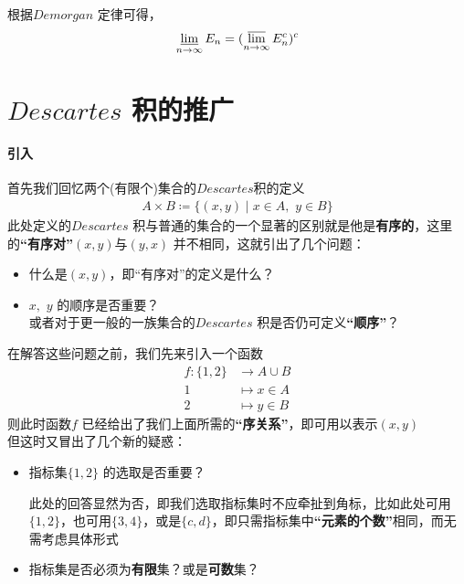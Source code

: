 	根据$Demorgan$ 定律可得，
		\[\varliminf_{n \to \infty}{E_n} = (\varlimsup_{n \to \infty}{E_{n}^{c}})^c\]
		
\section{$Descartes$ 积的推广}
\paragraph{引入}
	首先我们回忆两个(有限个)集合的$Descartes$积的定义
	\begin{align}
		A \times B \coloneqq \{ (x , y) \mid x \in A , \,\, y \in B \}
	\end{align}
	此处定义的$Descartes$ 积与普通的集合的一个显著的区别就是他是\textbf{有序的}，这里的\textbf{“有序对”}$(x , y)$与$(y , x)$ 并不相同，这就引出了几个问题：
	\begin{itemize}
		\item 什么是$(x , y)$，即“有序对”的定义是什么？
		
		\item $x , \,\, y$ 的顺序是否重要？\\
		或者对于更一般的一族集合的$Descartes$ 积是否仍可定义\textbf{“顺序”}？
	\end{itemize}
	在解答这些问题之前，我们先来引入一个函数
	\begin{align}
		f : \{ 1 , 2 \} &\longrightarrow A \cup B\\
		1 &\longmapsto x \in A\\
		2 &\longmapsto y \in B
	\end{align}
	则此时函数$f$ 已经给出了我们上面所需的\textbf{“序关系”}，即可用以表示$(x , y)$\\
	但这时又冒出了几个新的疑惑：
	\begin{itemize}
		\item 指标集$\{ 1 , 2 \}$ 的选取是否重要？
		\begin{rmk}
			此处的回答显然为否，即我们选取指标集时不应牵扯到角标，比如此处可用$\{ 1 , 2 \}$，也可用$\{ 3 , 4 \}$，或是$\{ c , d \}$，即只需指标集中\textbf{“元素的个数”}相同，而无需考虑具体形式
		\end{rmk}
		
		\item 指标集是否必须为\textbf{有限}集？或是\textbf{可数}集？
	\end{itemize}
	
